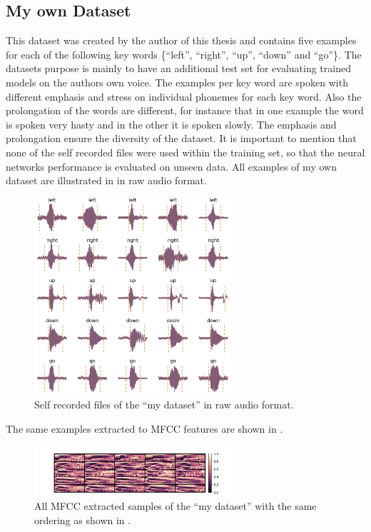 \subsection{My own Dataset}\label{sec:exp_dataset_my}
This dataset was created by the author of this thesis and contains five examples for each of the following key words \{\enquote{left}, \enquote{right}, \enquote{up}, \enquote{down} and \enquote{go}\}.
The datasets purpose is mainly to have an additional test set for evaluating trained models on the authors own voice.
The examples per key word are spoken with different emphasis and stress on individual phonemes for each key word.
Also the prolongation of the words are different, for instance that in one example the word is spoken very hasty and in the other it is spoken slowly.
The emphasis and prolongation ensure the diversity of the dataset. 
It is important to mention that none of the self recorded files were used within the training set, so that the neural networks performance is evaluated on unseen data.
All examples of my own dataset are illustrated in  in raw audio format.
\begin{figure}[!ht]
  \centering
    \includegraphics[width=0.65\textwidth]{./5_exp/figs/exp_dataset_my_wav_grid}
  \caption{Self recorded files of the \enquote{my dataset} in raw audio format.}
  \label{fig:exp_dataset_my_wav_grid}
\end{figure}
\FloatBarrier
\noindent
The same examples extracted to MFCC features are shown in .
\begin{figure}[!ht]
  \centering
    \includegraphics[width=0.65\textwidth]{./5_exp/figs/exp_dataset_my_mfcc}
  \caption{All MFCC extracted samples of the \enquote{my dataset} with the same ordering as shown in .}
  \label{fig:exp_dataset_my_mfcc}
\end{figure}
